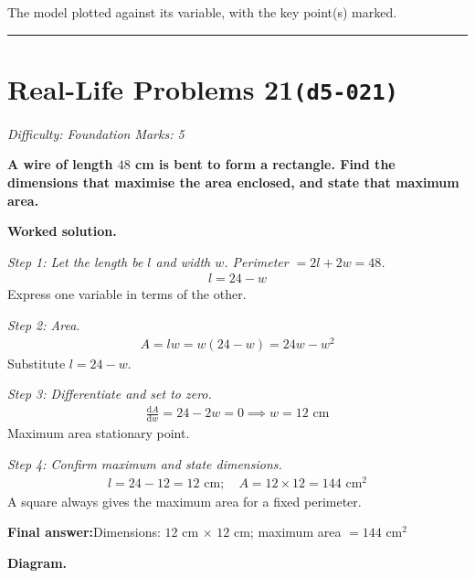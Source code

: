 \documentclass[11pt]{article}
\newcommand{\question}[1]{\par\medskip\noindent\textbf{#1}\par}
\begin{document}
\small The model plotted against its variable, with the key point(s) marked.\normalsize

\medskip\hrule

\section*{Real-Life Problems 21\quad\small\texttt{(d5-021)}}
\textit{Difficulty: Foundation \quad\textbar\quad Marks: 5}

\question{A wire of length \( 48 \) cm is bent to form a rectangle. Find the dimensions that maximise the area enclosed, and state that maximum area.}

\textbf{Worked solution.}

\textit{Step 1: Let the length be \( l \) and width \( w \). Perimeter \( = 2l + 2w = 48 \).}
\[\begin{gathered}
l = 24 - w
\end{gathered}\]
Express one variable in terms of the other.

\textit{Step 2: Area.}
\[\begin{gathered}
A = lw = w(24 - w) = 24w - w^2
\end{gathered}\]
Substitute \( l = 24 - w \).

\textit{Step 3: Differentiate and set to zero.}
\[\begin{gathered}
\frac{\mathrm{d}A}{\mathrm{d}w} = 24 - 2w = 0 \implies w = 12 \text{ cm}
\end{gathered}\]
Maximum area stationary point.

\textit{Step 4: Confirm maximum and state dimensions.}
\[\begin{gathered}
l = 24 - 12 = 12 \text{ cm}; \quad A = 12 \times 12 = 144 \text{ cm}^2
\end{gathered}\]
A square always gives the maximum area for a fixed perimeter.

\begin{answerbox}
\textbf{Final answer:}\quad Dimensions: \(\displaystyle  12 \) cm \(\displaystyle \times\) \(\displaystyle  12 \) cm; maximum area \(\displaystyle  = 144 \text{ cm}^2 \)
\end{answerbox}
\textbf{Diagram.}
\end{document}
